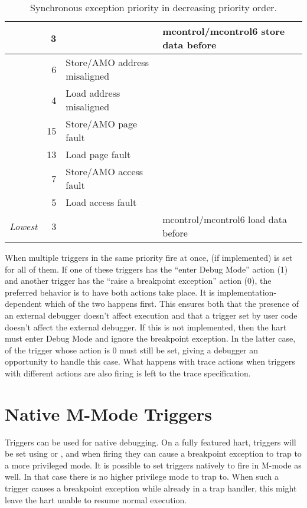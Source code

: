 \begin{table}[H]
\begin{tabular}{|l|r|l|l|}
                &          3 & & mcontrol/mcontrol6 store data before \\ \hline
                &          6 & Store/AMO address misaligned & \\
                &          4 & Load address misaligned & \\ \hline
                &         15 & Store/AMO page fault & \\
                &         13 & Load page fault & \\ \hline
                &          7 & Store/AMO access fault & \\
                &          5 & Load access fault & \\
  {\em Lowest}  &          3 & & mcontrol/mcontrol6 load data before \\
  \hline
\end{tabular}
\caption{Synchronous exception priority in decreasing priority order.}
\label{tab:priority}
\end{table}

When multiple triggers in the same priority fire at once, \FcsrMcontrolHit (if
implemented) is set for all of them. If one of these triggers has
the ``enter Debug Mode'' action (1) and another
trigger has the ``raise a breakpoint exception'' action (0),
the preferred behavior is to have both actions take place.  It is
implementation-dependent which of the two happens first.  This ensures both
that the presence of an external debugger doesn't affect execution and that a
trigger set by user code doesn't affect the external debugger. If this is not
implemented, then the hart must enter Debug Mode and ignore the breakpoint
exception. In the latter case, \FcsrMcontrolHit of the trigger whose action is 0 must still
be set, giving a debugger an opportunity to handle this case. What happens with
trace actions when triggers with different actions are also firing is left to
the trace specification.

\section{Native M-Mode Triggers}
\label{sec:mmtrigger}

Triggers can be used for native debugging. On a fully featured hart, triggers
will be set using \FcsrMcontrolU or \FcsrMcontrolS, and when firing they can cause a breakpoint exception
to trap to a more privileged mode. It is possible to set triggers natively to
fire in M-mode as well. In that case there is no higher privilege mode to trap
to. When such a trigger causes a breakpoint exception while already in a trap
handler, this might leave the hart unable to resume normal execution.

